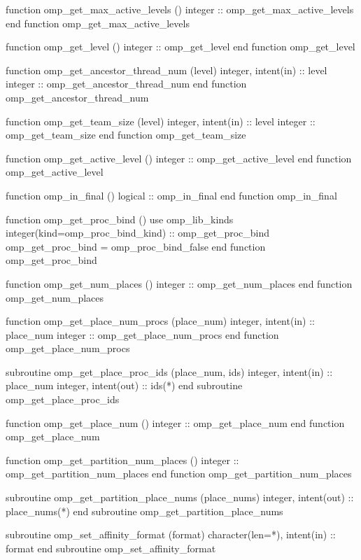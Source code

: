 {\begin{ompfFunction}
          function omp_get_max_active_levels ()
           integer :: omp_get_max_active_levels
          end function omp_get_max_active_levels

          function omp_get_level ()
           integer :: omp_get_level
          end function omp_get_level

          function omp_get_ancestor_thread_num (level)
           integer, intent(in) :: level
           integer :: omp_get_ancestor_thread_num
          end function omp_get_ancestor_thread_num

          function omp_get_team_size (level)
           integer, intent(in) :: level
           integer :: omp_get_team_size
          end function omp_get_team_size

          function omp_get_active_level ()
           integer :: omp_get_active_level
          end function omp_get_active_level

          function omp_in_final ()
           logical :: omp_in_final
          end function omp_in_final

          function omp_get_proc_bind ()
           use omp_lib_kinds
           integer(kind=omp_proc_bind_kind) :: omp_get_proc_bind
           omp_get_proc_bind = omp_proc_bind_false
          end function omp_get_proc_bind

          function omp_get_num_places ()
           integer :: omp_get_num_places
          end function omp_get_num_places

          function omp_get_place_num_procs (place_num)
           integer, intent(in) :: place_num
           integer :: omp_get_place_num_procs
          end function omp_get_place_num_procs

          subroutine omp_get_place_proc_ids (place_num, ids)
           integer, intent(in) :: place_num
           integer, intent(out) :: ids(*)
          end subroutine omp_get_place_proc_ids

          function omp_get_place_num ()
           integer :: omp_get_place_num
          end function omp_get_place_num

          function omp_get_partition_num_places ()
           integer :: omp_get_partition_num_places
          end function omp_get_partition_num_places

          subroutine omp_get_partition_place_nums (place_nums)
           integer, intent(out) :: place_nums(*)
          end subroutine omp_get_partition_place_nums

          subroutine omp_set_affinity_format (format)
           character(len=*), intent(in) :: format
          end subroutine omp_set_affinity_format


\end{ompfFunction}}
